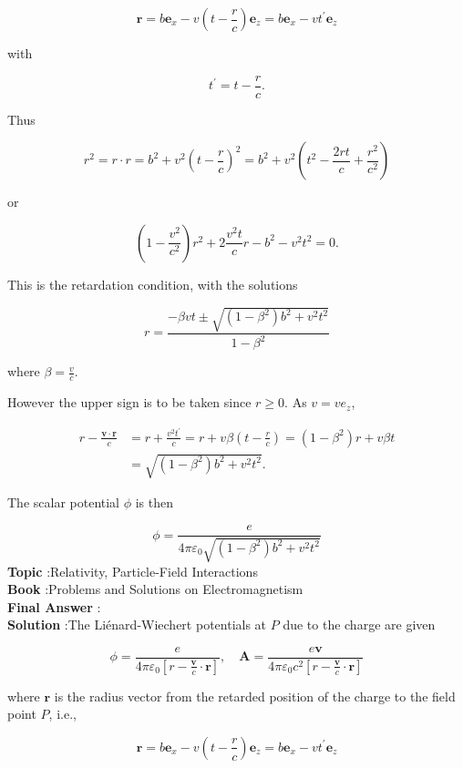 \documentclass[10pt]{article}
\begin{document}
$$
\mathbf{r}=b \mathbf{e}_{x}-v\left(t-\frac{r}{c}\right) \mathbf{e}_{z}=b \mathbf{e}_{x}-v t^{\prime} \mathbf{e}_{z}
$$

with

$$
t^{\prime}=t-\frac{r}{c} .
$$

Thus

$$
r^{2}=r \cdot r=b^{2}+v^{2}\left(t-\frac{r}{c}\right)^{2}=b^{2}+v^{2}\left(t^{2}-\frac{2 r t}{c}+\frac{r^{2}}{c^{2}}\right)
$$

or

$$
\left(1-\frac{v^{2}}{c^{2}}\right) r^{2}+2 \frac{v^{2} t}{c} r-b^{2}-v^{2} t^{2}=0 .
$$

This is the retardation condition, with the solutions

$$
r=\frac{-\beta v t \pm \sqrt{\left(1-\beta^{2}\right) b^{2}+v^{2} t^{2}}}{1-\beta^{2}}
$$

where $\beta=\frac{v}{c}$.

However the upper sign is to be taken since $r \geq 0$. As $v=v e_{z}$,

$$
\begin{aligned}
r-\frac{\mathbf{v} \cdot \mathbf{r}}{c} &=r+\frac{v^{2} t^{\prime}}{c}=r+v \beta\left(t-\frac{r}{c}\right)=\left(1-\beta^{2}\right) r+v \beta t \\
&=\sqrt{\left(1-\beta^{2}\right) b^{2}+v^{2} t^{2}} .
\end{aligned}
$$

The scalar potential $\phi$ is then

$$
\phi=\frac{e}{4 \pi \varepsilon_{0} \sqrt{\left(1-\beta^{2}\right) b^{2}+v^{2} t^{2}}}
$$
\textbf{Topic} :Relativity, Particle-Field Interactions\\
\textbf{Book} :Problems and Solutions on Electromagnetism\\
\textbf{Final Answer} :\\


\textbf{Solution} :The Liénard-Wiechert potentials at $P$ due to the charge are given

$$
\phi=\frac{e}{4 \pi \varepsilon_{0}\left[r-\frac{\mathbf{v}}{c} \cdot \mathbf{r}\right]}, \quad \mathbf{A}=\frac{e \mathbf{v}}{4 \pi \varepsilon_{0} c^{2}\left[r-\frac{\mathbf{v}}{c} \cdot \mathbf{r}\right]}
$$

where $\mathbf{r}$ is the radius vector from the retarded position of the charge to the field point $P$, i.e.,

$$
\mathbf{r}=b \mathbf{e}_{x}-v\left(t-\frac{r}{c}\right) \mathbf{e}_{z}=b \mathbf{e}_{x}-v t^{\prime} \mathbf{e}_{z}
$$
\end{document}
